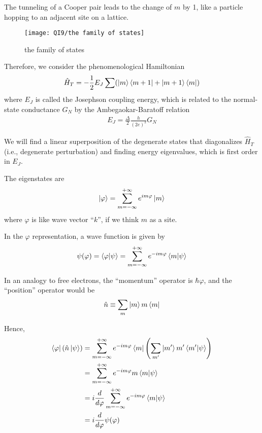 The tunneling of a Cooper pair leads to the change of $m$ by
1, like a particle hopping to an adjacent site on a lattice.

\begin{figure}[H]
    \centering
    \texttt{[image: QI9/the family of states]}
    \caption{the family of states}
\end{figure}

Therefore, we consider the phenomenological Hamiltonian
\begin{align*}
    \hat{H}_T=-\frac{1}{2}E_J\sum(\ket{m}\bra{m+1}+\ket{m+1}\bra{m})
\end{align*}
where $E_J$ is called the Josephson coupling energy, which is
related to the normal-state conductance $G_N$ by the Ambegaokar-Baratoff relation
\begin{align*}
    E_J=\frac{\Delta}{2}\frac{h}{(2e)^2}G_N
\end{align*}

We will find a linear superposition of the degenerate states that diagonalizes $\hat{H}_T$ (i.e., degenerate perturbation) and finding energy eigenvalues, which is first order in $E_J$. 

The eigenstates are
\begin{align*}
    \ket{\varphi }=\sum_{m=-\infty}^{+\infty}e^{im\varphi}\ket{m}
\end{align*}
where $\varphi$ is like wave vector ``$k$'', if we think $m$ as a site. 

In the $\varphi$ representation, a wave function is given by
\begin{align*}
    \psi(\varphi)=\braket{\varphi|\psi}=\sum_{m=-\infty}^{+\infty}e^{-im\varphi}\braket{m|\psi}
\end{align*}

In an analogy to free electrons, the ``momentum'' operator is $\hbar \varphi$, and the ``position'' operator would be
\begin{align*}
    \hat{n}\equiv\sum_m\ket{m}m\bra{m}
\end{align*}

Hence,
\begin{align*}
    \bra{\varphi}(\hat{n}\ket{\psi})&=\sum_{m=-\infty}^{+\infty}e^{-im\varphi}\bra{m}\left( \sum_{m'}\ket{m'}m'\braket{m'|\psi} \right)\\
    &=\sum_{m=-\infty}^{+\infty}e^{-im\varphi}m\braket{m|\psi}\\
    &=i\frac{d}{d\varphi}\sum_{m=-\infty}^{+\infty}e^{-im\varphi}\braket{m|\psi}\\
    &=i\frac{d}{d\varphi}\psi(\varphi)
\end{align*}

